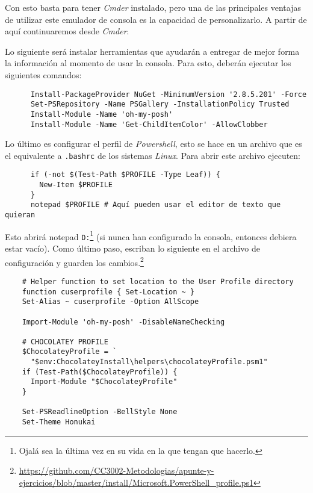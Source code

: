     Con esto basta para tener \textit{Cmder} instalado, pero una de las principales ventajas
    de utilizar este emulador de consola es la capacidad de personalizarlo.
    A partir de aquí continuaremos desde \textit{Cmder}.
    
    Lo siguiente será instalar herramientas que ayudarán a entregar de mejor forma la información 
    al momento de usar la consola.
    Para esto, deberán ejecutar los siguientes comandos:

    \begin{verbatim}
      Install-PackageProvider NuGet -MinimumVersion '2.8.5.201' -Force
      Set-PSRepository -Name PSGallery -InstallationPolicy Trusted
      Install-Module -Name 'oh-my-posh'
      Install-Module -Name 'Get-ChildItemColor' -AllowClobber
    \end{verbatim}

    Lo último es configurar el perfil de \textit{Powershell}, esto se hace en un archivo que
    es el equivalente a \texttt{.bashrc} de los sistemas \textit{Linux}.
    Para abrir este archivo ejecuten:

    \begin{verbatim}
      if (-not $(Test-Path $PROFILE -Type Leaf)) {
        New-Item $PROFILE
      }
      notepad $PROFILE # Aquí pueden usar el editor de texto que quieran
    \end{verbatim}

  Esto abrirá notepad \texttt{D:}\footnote{Ojalá sea la última vez en su vida en la que tengan que 
  hacerlo.} (si nunca han configurado la consola, entonces debiera estar vacío).
  Como último paso, escriban lo siguiente en el archivo de configuración y guarden los 
  cambios.\footnote{
    \url{https://github.com/CC3002-Metodologias/apunte-y-ejercicios/blob/master/install/Microsoft.PowerShell_profile.ps1}
  }

  \begin{verbatim}
    # Helper function to set location to the User Profile directory
    function cuserprofile { Set-Location ~ }
    Set-Alias ~ cuserprofile -Option AllScope

    Import-Module 'oh-my-posh' -DisableNameChecking

    # CHOCOLATEY PROFILE
    $ChocolateyProfile = `
      "$env:ChocolateyInstall\helpers\chocolateyProfile.psm1"
    if (Test-Path($ChocolateyProfile)) {
      Import-Module "$ChocolateyProfile"
    }

    Set-PSReadlineOption -BellStyle None
    Set-Theme Honukai
  \end{verbatim}

